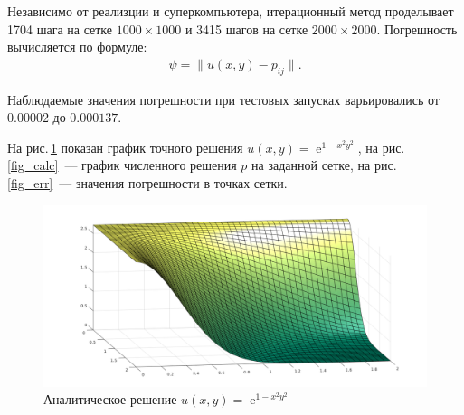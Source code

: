 \documentclass[11pt]{article}
\numberwithin{equation}{section}
\theoremstyle{plain}
\theoremstyle{definition}
\DeclareMathOperator{\expon}{e}
\begin{document}
Независимо от реализции и суперкомпьютера, итерационный метод проделывает
1704 шага на сетке $1000\times1000$ и 3415 шагов на сетке $2000\times2000$. Погрешность
вычисляется по формуле:
\[\begin{aligned}
    \psi=\|u(x,y)-p_{ij}\|.
\end{aligned}\]

Наблюдаемые значения погрешности при тестовых запусках варьировались
от $0.00002$ до $0.000137$.

На рис.\,\ref{fig_real} показан график точного решения $u(x,y)=\expon^{1-x^2y^2}$,
на рис.\,\ref{fig_calc}~--- график численного решения $p$ на заданной сетке,
на рис.\,\ref{fig_err}~--- значения погрешности в точках сетки.

\begin{figure}[h]
    \centering
    \includegraphics[width=\textwidth]{fig_real}
    \caption{Аналитическое решение $u(x,y)=\expon^{1-x^2y^2}$}
    \label{fig_real}
\end{figure}
\end{document}
